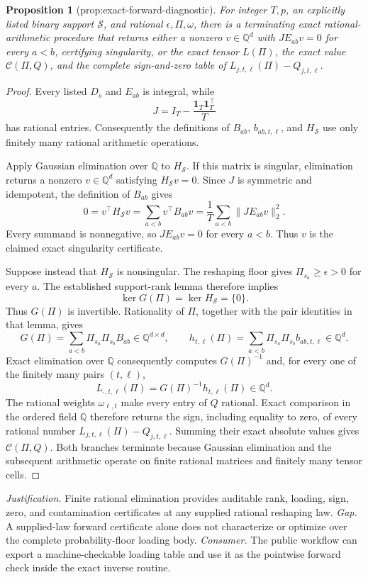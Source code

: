\documentclass{article}
\newtheorem{proposition}{Proposition}
\begin{document}
\begin{proposition}[prop:exact-forward-diagnostic]\label{prop:exact-forward-diagnostic}
For integer \(T,p\), an explicitly listed binary support \(\mathcal S\), and rational \(\epsilon,\Pi,\omega\), there is a terminating exact rational-arithmetic procedure that returns either a nonzero \(v\in\mathbb Q^{d}\) with \(JE_{ab}v=0\) for every \(a<b\), certifying singularity, or the exact tensor \(L(\Pi)\), the exact value \(\mathcal C(\Pi,Q)\), and the complete sign-and-zero table of \(L_{j,t,\ell}(\Pi)-Q_{j,t,\ell}\).
\end{proposition}
\begin{proof}
Every listed \(D_s\) and \(E_{ab}\) is integral, while
\[
 J=I_T-\frac{\mathbf 1_T\mathbf 1_T^{\top}}{T}
\]
has rational entries.  Consequently the definitions of \(B_{ab}\), \(b_{ab,t,\ell}\), and \(H_{\mathcal S}\) use only finitely many rational arithmetic operations.

Apply Gaussian elimination over \(\mathbb Q\) to \(H_{\mathcal S}\).  If this matrix is singular, elimination returns a nonzero \(v\in\mathbb Q^d\) satisfying \(H_{\mathcal S}v=0\).  Since \(J\) is symmetric and idempotent, the definition of \(B_{ab}\) gives
\[
 0=v^{\top}H_{\mathcal S}v
 =\sum_{a<b}v^{\top}B_{ab}v
 =\frac1T\sum_{a<b}\lVert JE_{ab}v\rVert_2^2.
\]
Every summand is nonnegative, so \(JE_{ab}v=0\) for every \(a<b\).  Thus \(v\) is the claimed exact singularity certificate.

Suppose instead that \(H_{\mathcal S}\) is nonsingular.  The reshaping floor gives \(\Pi_{s_a}\geq\epsilon>0\) for every \(a\).  The established support-rank lemma therefore implies
\[
 \ker G(\Pi)=\ker H_{\mathcal S}=\{0\}.
\]
Thus \(G(\Pi)\) is invertible.  Rationality of \(\Pi\), together with the pair identities in that lemma, gives
\[
 G(\Pi)=\sum_{a<b}\Pi_{s_a}\Pi_{s_b}B_{ab}\in\mathbb Q^{d\times d},
 \qquad
 h_{t,\ell}(\Pi)=\sum_{a<b}\Pi_{s_a}\Pi_{s_b}b_{ab,t,\ell}\in\mathbb Q^d.
\]
Exact elimination over \(\mathbb Q\) consequently computes \(G(\Pi)^{-1}\) and, for every one of the finitely many pairs \((t,\ell)\),
\[
 L_{\cdot,t,\ell}(\Pi)=G(\Pi)^{-1}h_{t,\ell}(\Pi)\in\mathbb Q^d.
\]
The rational weights \(\omega_{\ell,t}\) make every entry of \(Q\) rational.  Exact comparison in the ordered field \(\mathbb Q\) therefore returns the sign, including equality to zero, of every rational number \(L_{j,t,\ell}(\Pi)-Q_{j,t,\ell}\).  Summing their exact absolute values gives \(\mathcal C(\Pi,Q)\).  Both branches terminate because Gaussian elimination and the subsequent arithmetic operate on finite rational matrices and finitely many tensor cells.
\end{proof}
\par\smallskip\noindent \textit{Justification.} Finite rational elimination provides auditable rank, loading, sign, zero, and contamination certificates at any supplied rational reshaping law. \textit{Gap.} A supplied-law forward certificate alone does not characterize or optimize over the complete probability-floor loading body. \textit{Consumer.} The public workflow can export a machine-checkable loading table and use it as the pointwise forward check inside the exact inverse routine.
\end{document}
